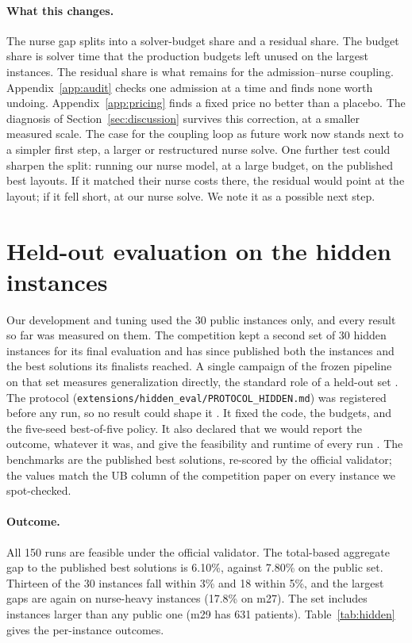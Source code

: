 \documentclass[11pt]{article}
\begin{document}
	\paragraph{What this changes.} The nurse gap splits into a solver-budget share and a residual
	share. The budget share is solver time that the production budgets left unused on the largest instances. The residual share is what remains for the admission--nurse coupling. Appendix~\ref{app:audit} checks one admission at a time and finds none worth undoing. Appendix~\ref{app:pricing} finds a fixed price no better than a placebo. The diagnosis of Section~\ref{sec:discussion} survives this correction, at a smaller measured scale. The case for the coupling loop as future work now stands next to a simpler first step, a larger or restructured nurse solve. One further test could sharpen the split: running our nurse model,
	at a large budget, on the published best layouts. If it matched their nurse costs there, the residual would point at the
	layout; if it fell short, at our nurse solve. We note it as a possible next step.

	\section{Held-out evaluation on the hidden instances}\label{app:hidden}
	Our development and tuning used the 30 public instances only, and every result so far was
	measured on them. The competition kept a second set of 30 hidden instances for its final
	evaluation and has since published both the instances and the best solutions its finalists
	reached. A single campaign of the frozen pipeline on that set measures generalization directly,
	the standard role of a held-out set \citep{hastie2009}.
	The protocol (\texttt{extensions/hidden\_eval/PROTOCOL\_HIDDEN.md}) was registered before any run, so no result could shape it \citep{nosek2018}. It fixed the code, the budgets, and the five-seed best-of-five policy. It also declared that we would report the outcome, whatever it was, and give the feasibility and runtime of every run \citep{barr1995}. The benchmarks are the published best
	solutions, re-scored by the official validator; the values match the UB column of the
	competition paper \citep{ihtc2024paper} on every instance we spot-checked.

	\paragraph{Outcome.} All 150 runs are feasible under the official validator. The total-based
	aggregate gap to the published best solutions is 6.10\%, against 7.80\% on the public set.
	Thirteen of the 30 instances fall within 3\% and 18 within 5\%, and the largest gaps are again
	on nurse-heavy instances (17.8\% on m27). The set includes instances larger than any public one
	(m29 has 631 patients). Table~\ref{tab:hidden} gives the per-instance outcomes.
\end{document}
